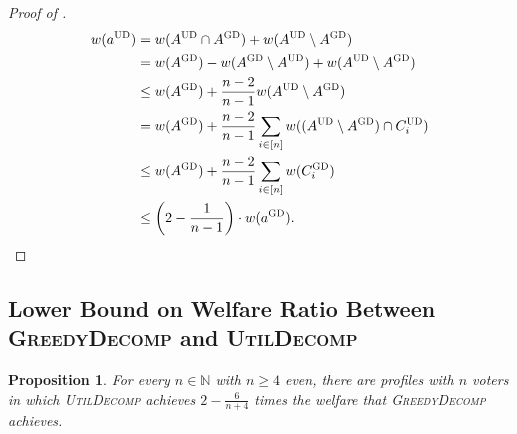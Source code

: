 \documentclass[11pt]{article}
\newcommand{\N}{\mathbb{N}}
\newcommand{\optd}{\textsc{UD}}
\newcommand{\GrdDec}{\textsc{GreedyDecomp} }
\newcommand{\GrdDecs}{\textsc{GD} }%
\newcommand{\UtDec}{\textsc{UtilDecomp} }
\newtheorem{proposition}{Proposition}
\begin{document}
\begin{proof}[Proof of ]
    \begin{align*}
        w(a^\optd) 
        & = w(A^\optd \cap A^\GrdDecs) + w(A^\optd \setminus A^\GrdDecs)  \\
        & = w(A^\GrdDecs) - w(A^\GrdDecs \setminus A^\optd) +  w(A^\optd \setminus A^\GrdDecs)  \\
        & \le w(A^\GrdDecs) + \frac{n-2}{n-1} w(A^\optd \setminus A^\GrdDecs)  \\
        & = w(A^\GrdDecs) + \frac{n-2}{n-1} \sum_{i \in [n]} w((A^\optd \setminus A^\GrdDecs) \cap C^\optd_i) \\
        & \le w(A^\GrdDecs) + \frac{n-2}{n-1} \sum_{i \in [n]} w(C^\GrdDecs_i) \\
        & \le \bigg(2 - \frac{1}{n-1}\bigg) \cdot w(a^\GrdDecs).\qedhere
    \end{align*}
\end{proof}

\subsection{Lower Bound on Welfare Ratio Between \GrdDec and \UtDec}\label{app:lbGrdDec}

\begin{proposition}\label{prop:lbGrdDec}
    For every $n\in \N$ with $n\geq 4$ even, there are profiles with $n$ voters in which \UtDec achieves $2-\frac{6}{n+4}$ times the welfare that \GrdDec achieves.
\end{proposition}
\end{document}
